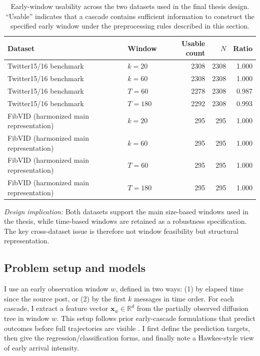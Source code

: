\begin{table}[htbp]
  \centering
  \caption{Early-window usability across the two datasets used in the final thesis design. ``Usable'' indicates that a cascade contains sufficient information to construct the specified early window under the preprocessing rules described in this section.}
  \label{tab:early_usability}
  \begin{tabular}{llrrr}
    \toprule
    Dataset & Window & Usable count & $N$ & Ratio \\
    \midrule
    Twitter15/16 benchmark & $k=20$ & 2308 & 2308 & 1.000 \\
    Twitter15/16 benchmark & $k=60$ & 2308 & 2308 & 1.000 \\
    Twitter15/16 benchmark & $T=60$ & 2278 & 2308 & 0.987 \\
    Twitter15/16 benchmark & $T=180$ & 2292 & 2308 & 0.993 \\
    \addlinespace
    FibVID (harmonized main representation) & $k=20$ & 295 & 295 & 1.000 \\
    FibVID (harmonized main representation) & $k=60$ & 295 & 295 & 1.000 \\
    FibVID (harmonized main representation) & $T=60$ & 295 & 295 & 1.000 \\
    FibVID (harmonized main representation) & $T=180$ & 295 & 295 & 1.000 \\
    \bottomrule
  \end{tabular}

  \vspace{0.3em}
  {\footnotesize \textit{Design implication:} Both datasets support the main size-based windows used in the thesis, while time-based windows are retained as a robustness specification. The key cross-dataset issue is therefore not window feasibility but structural representation.}
\end{table}

\subsection{Problem setup and models}
I use an early observation window $w$, defined in two ways: (1) by elapsed time since the source post, or (2) by the first $k$ messages in time order. For each cascade, I extract a feature vector $\mathbf{x}_w \in \mathbb{R}^d$ from the partially observed diffusion tree in window $w$. This setup follows prior early-cascade formulations that predict outcomes before full trajectories are visible \citep{szabo_predicting_2010,cheng_can_2014}. I first define the prediction targets, then give the regression/classification forms, and finally note a Hawkes-style view of early arrival intensity.

